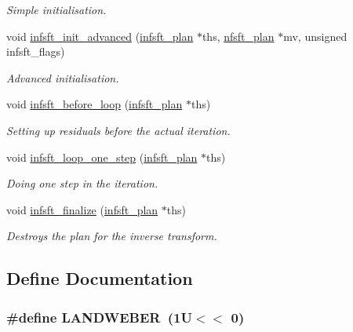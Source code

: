 \begin{CompactItemize}
\begin{CompactList}\small\item\em Simple initialisation. \item\end{CompactList}\item 
\hypertarget{group__solver_ga31}{
void \hyperlink{group__solver_ga31}{infsft\_\-init\_\-advanced} (\hyperlink{structinfsft__plan}{infsft\_\-plan} $\ast$ths, \hyperlink{structnfsft__plan}{nfsft\_\-plan} $\ast$mv, unsigned infsft\_\-flags)}
\label{group__solver_ga31}

\begin{CompactList}\small\item\em Advanced initialisation. \item\end{CompactList}\item 
\hypertarget{group__solver_ga32}{
void \hyperlink{group__solver_ga32}{infsft\_\-before\_\-loop} (\hyperlink{structinfsft__plan}{infsft\_\-plan} $\ast$ths)}
\label{group__solver_ga32}

\begin{CompactList}\small\item\em Setting up residuals before the actual iteration. \item\end{CompactList}\item 
\hypertarget{group__solver_ga33}{
void \hyperlink{group__solver_ga33}{infsft\_\-loop\_\-one\_\-step} (\hyperlink{structinfsft__plan}{infsft\_\-plan} $\ast$ths)}
\label{group__solver_ga33}

\begin{CompactList}\small\item\em Doing one step in the iteration. \item\end{CompactList}\item 
\hypertarget{group__solver_ga34}{
void \hyperlink{group__solver_ga34}{infsft\_\-finalize} (\hyperlink{structinfsft__plan}{infsft\_\-plan} $\ast$ths)}
\label{group__solver_ga34}

\begin{CompactList}\small\item\em Destroys the plan for the inverse transform. \item\end{CompactList}\end{CompactItemize}


\subsection{Define Documentation}
\hypertarget{group__solver_ga35}{
\subsubsection[LANDWEBER]{\setlength{\rightskip}{0pt plus 5cm}\#define LANDWEBER~(1U$<$$<$ 0)}}
\label{group__solver_ga35}


